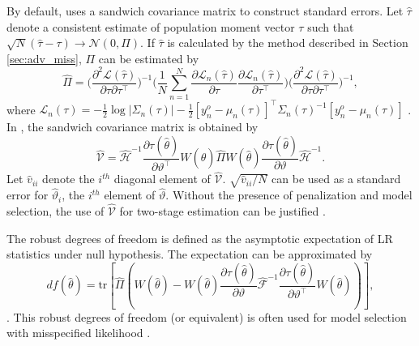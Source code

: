 \documentclass[nojss]{jss}
\begin{document}
\begin{appendix}
By default,  uses a sandwich covariance matrix to construct standard errors. Let $\hat{\tau}$ denote a consistent estimate of population moment vector $\tau$ such that $\sqrt{N}(\hat{\tau} - \tau) \rightarrow \mathcal{N}(0,\Pi)$. If $\hat{\tau}$ is calculated by the method described in Section \ref{sec:adv_miss}, $\Pi$ can be estimated by
\begin{equation}
\widehat{\Pi} = 
\bigg ( 
\frac{\partial^2 \mathcal{L}(\hat{\tau})}{\partial \tau \partial \tau^\top} 
\bigg)^{-1}
\bigg ( 
\frac{1}{N}
\sum_{n=1}^N 
\frac{\partial \mathcal{L}_n(\hat{\tau})}{\partial \tau} 
\frac{\partial \mathcal{L}_n(\hat{\tau})}{\partial \tau^\top}
\bigg )
\bigg ( 
\frac{\partial^2 \mathcal{L}(\hat{\tau})}{\partial \tau \partial \tau^\top} 
\bigg)^{-1},
\end{equation}
where $
\mathcal{L}_n(\tau) = -\frac{1}{2} \log{ \big| \Sigma_n(\tau) \big|} -
\frac{1}{2} [y_n^o - \mu_n(\tau)]^\top \Sigma_n(\tau)^{-1} [y_n^o - \mu_n(\tau)]
$ \citep[e.g.,][]{Yuan2008}. In , the sandwich covariance matrix is obtained by
\begin{equation}
\hat{\mathcal{V}} = 
\widehat{\mathcal{H}}^{-1} 
\frac{\partial \tau(\hat{\theta})}{\partial \vartheta^\top} 
W(\hat{\theta})
\widehat{\Pi}
W(\hat{\theta})
\frac{\partial \tau(\hat{\theta})}{\partial \vartheta} 
\widehat{\mathcal{H}}^{-1}.
\end{equation}
Let $\hat{v}_{ii}$ denote the $i^{th}$ diagonal element of $\hat{\mathcal{V}}$. $\sqrt{\hat{v}_{ii}/N}$ can be used as a standard error for $\hat{\vartheta}_i$, the $i^{th}$ element of $\hat{\vartheta}$. Without the presence of penalization and model selection, the use of $\hat{\mathcal{V}}$ for two-stage estimation can be justified \citep{Yuan2000}.

The robust degrees of freedom is defined as the asymptotic expectation of LR statistics under null hypothesis. The expectation can be approximated by
\begin{equation} \label{eq:df_robust}
df(\hat{\theta}) =
\text{tr} 
\left[ 
\widehat{\Pi} 
\left (
W(\hat{\theta}) - 
W(\hat{\theta}) \frac{\partial \tau(\hat{\theta})}{\partial \vartheta}  \widehat{\mathcal{F}
}^{-1}
\frac{\partial \tau(\hat{\theta})}{\partial \vartheta^{\top}} W(\hat{\theta}) 
\right )
\right ],
\end{equation}
\citep[e.g.,][]{Yuan2007}. This robust degrees of freedom (or equivalent) is often used for model selection with misspecified likelihood \citep[e.g.,][]{Konishi1996, Stone1977, Varin2005}.


\end{appendix}
\end{document}
